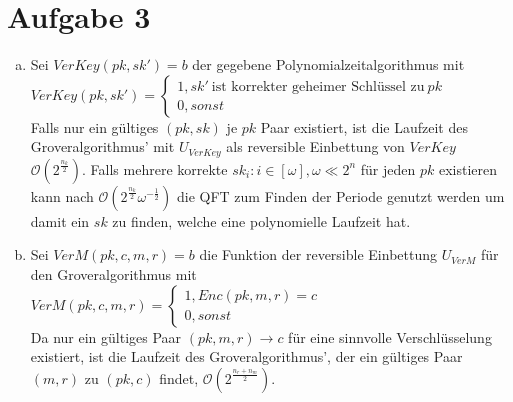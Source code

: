 \documentclass[a4paper]{scrartcl}
\begin{document}
\section*{Aufgabe 3}
\begin{enumerate}[a)]
\item Sei $VerKey(pk,sk')=b$ der gegebene Polynomialzeitalgorithmus mit\\
$VerKey(pk,sk')=\begin{cases} 1, sk' ~\text{ist korrekter geheimer Schlüssel zu}~ pk\\0, sonst \end{cases}$\\
Falls nur ein gültiges $(pk, sk)$ je $pk$ Paar existiert, ist die Laufzeit des Groveralgorithmus' mit $U_{VerKey}$ als reversible Einbettung von $VerKey$ $\mathcal{O}(2^{\frac{n_k}{2}})$. Falls mehrere korrekte $sk_i:  i \in [\omega], \omega \ll 2^n$ für jeden $pk$ existieren kann nach $\mathcal{O}(2^{\frac{n_k}{2}}\omega^{-\frac{1}{2}})$ die QFT zum Finden der Periode genutzt werden um damit ein $sk$ zu finden, welche eine polynomielle Laufzeit hat.
\item Sei $VerM(pk,c,m,r)=b$ die Funktion der reversible Einbettung $U_{VerM}$ für den Groveralgorithmus mit\\
$VerM(pk,c,m,r)=\begin{cases} 1, Enc(pk,m,r)=c\\0, sonst \end{cases}$\\
Da nur ein gültiges Paar $(pk,m,r)\rightarrow c$ für eine sinnvolle Verschlüsselung existiert, ist die Laufzeit des Groveralgorithmus', der ein gültiges Paar $(m,r)$ zu $(pk,c)$ findet, $\mathcal{O}(2^{\frac{n_r+n_m}{2}})$.
\end{enumerate}
\end{document}

